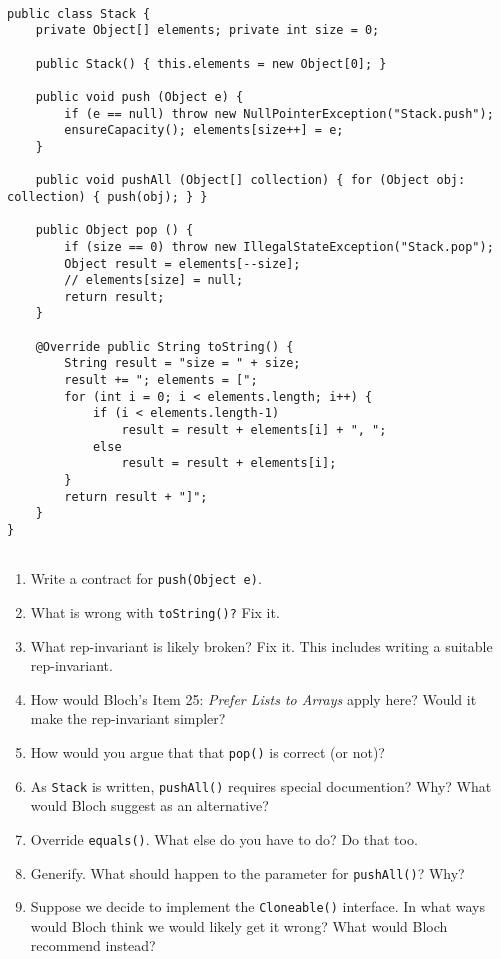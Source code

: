 \documentclass[11pt]{article}
\begin{document}
\begin{verbatim}

public class Stack {
    private Object[] elements; private int size = 0;

    public Stack() { this.elements = new Object[0]; }

    public void push (Object e) {
        if (e == null) throw new NullPointerException("Stack.push");
        ensureCapacity(); elements[size++] = e;  
    }

    public void pushAll (Object[] collection) { for (Object obj: collection) { push(obj); } }

    public Object pop () {
        if (size == 0) throw new IllegalStateException("Stack.pop");
        Object result = elements[--size];
        // elements[size] = null;
        return result;
    }

    @Override public String toString() {
        String result = "size = " + size;
        result += "; elements = [";
        for (int i = 0; i < elements.length; i++) {
            if (i < elements.length-1)
                result = result + elements[i] + ", ";
            else
                result = result + elements[i];
        }
        return result + "]";
    }
}


\end{verbatim}

\begin{enumerate}
\item Write a contract for \texttt{push(Object e)}.
\item What is wrong with \texttt{toString()?} Fix it.
\item What rep-invariant is likely broken? Fix it. This includes writing a suitable rep-invariant.
\item How would Bloch's Item 25: \emph{Prefer Lists to Arrays} apply here? Would it make the rep-invariant simpler?
\item How would you argue that that \texttt{pop()} is correct (or not)?
\item As \texttt{Stack} is written, \texttt{pushAll()} requires special documention? Why? What would Bloch suggest as an alternative?
\item Override \texttt{equals()}. What else do you have to do? Do that too.
\item Generify. What should happen to the parameter for \texttt{pushAll()}? Why?
\item Suppose we decide to implement the \texttt{Cloneable()} interface. In what ways would Bloch think we would likely get it wrong? What would Bloch recommend instead?
\end{enumerate}
\end{document}
